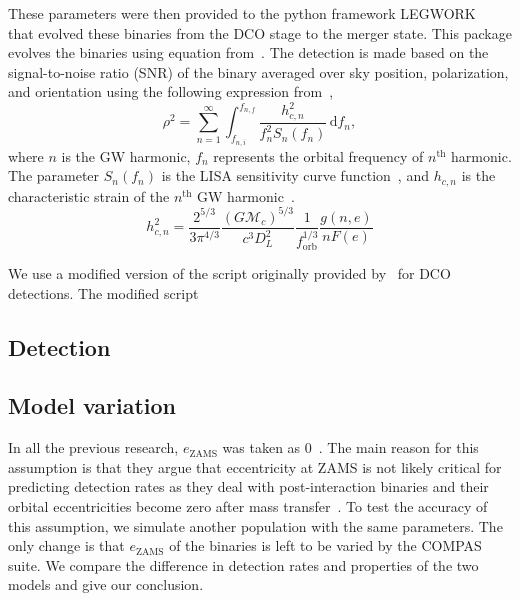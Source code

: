 These parameters were then provided to the python framework LEGWORK~\cite{wagg2021legwork} that evolved these binaries from the DCO stage to the merger state.
This package evolves the binaries using equation from~\cite{Peters1963, Peters1964}.
The detection is made based on the signal-to-noise ratio (SNR) of the binary averaged over sky position, polarization, and orientation using the following expression from~\cite{Finn2000},
\begin{equation}
    \rho^2 = \sum_{n=1}^{\infty}\int_{f_{n, i}}^{f_{n, f}}\frac{h_{c, n}^2}{f_n^2 S_n(f_n)}\,\text{d}f_n,
\end{equation}
where $n$ is the GW harmonic, $f_n$ represents the orbital frequency of $n^\text{th}$ harmonic.
The parameter $S_n(f_n)$ is the LISA sensitivity curve function~\cite{Robson2019}, and $h_{c, n}$ is the characteristic strain of the $n^\text{th}$ GW harmonic~\cite{Barack2004}.
\begin{equation}
    h_{c,n}^2 = \frac{2^{5/3}}{3\pi^{4/3}}\frac{(G\mathcal{M}_c)^{5/3}}{c^3 D_L^2}\frac{1}{f_\text{orb}^{1/3}}\frac{g
        (n, e)}{nF(e)}
\end{equation}

We use a modified version of the script originally provided by~\cite{wagg2021gravitational} for DCO detections.
The modified script

\subsection{Detection}\label{subsec:d}

\subsection{Model variation} \label{subsec:mv}
In all the previous research, $e_\text{ZAMS}$ was taken as $0$~\cite{Vigna2018, Barrett2018, Lau2020, Broekgaarden2021, wagg2021gravitational}.
The main reason for this assumption is that they argue that eccentricity at ZAMS is not likely critical for predicting detection rates as they deal with post-interaction binaries and their orbital eccentricities become zero after mass transfer~\cite{Hurley2002}. %
To test the accuracy of this assumption, we simulate another population with the same parameters.
The only change is that $e_\text{ZAMS}$ of the binaries is left to be varied by the COMPAS suite.
We compare the difference in detection rates and properties of the two models and give our conclusion.

